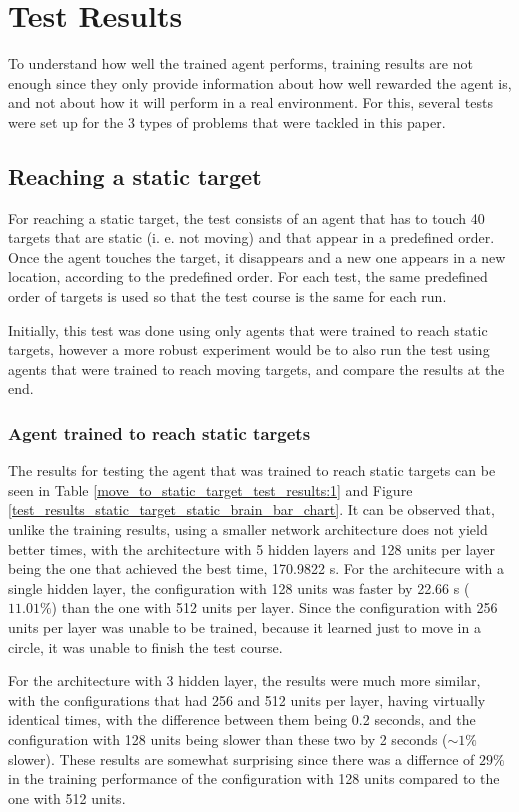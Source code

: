 \chapter{Test Results}

To understand how well the trained agent performs, training results are not enough since they only provide information about how well rewarded the agent is, and not about how it will perform in a real environment. For this, several tests were set up for the 3 types of problems that were tackled in this paper.


\section{Reaching a static target}

For reaching a static target, the test consists of an agent that has to touch 40 targets that are static (i. e. not moving) and that appear in a predefined order. Once the agent touches the target, it disappears and a new one appears in a new location, according to the predefined order. For each test, the same predefined order of targets is used so that the test course is the same for each run. 

Initially, this test was done using only agents that were trained to reach static targets, however a more robust experiment would be to also run the test using agents that were trained to reach moving targets, and compare the results at the end.


\subsection{Agent trained to reach static targets}

The results for testing the agent that was trained to reach static targets can be seen in Table \ref{move_to_static_target_test_results:1} and Figure \ref{test_results_static_target_static_brain_bar_chart}. It can be observed that, unlike the training results, using a smaller network architecture does not yield better times, with the architecture with 5 hidden layers and 128 units per layer being the one that achieved the best time, 170.9822 s. For the architecure with a single hidden layer, the configuration with 128 units was faster by 22.66 s ($11.01\%$) than the one with 512 units per layer. Since the configuration with 256 units per layer was unable to be trained, because it learned just to move in a circle, it was unable to finish the test course.

For the architecture with 3 hidden layer, the results were much more similar, with the configurations that had 256 and 512 units per layer, having virtually identical times, with the difference between them being 0.2 seconds, and the configuration with 128 units being slower than these two by 2 seconds ($\sim1\%$ slower). These results are somewhat surprising since there was a differnce of $29\%$ in the training performance of the configuration with 128 units compared to the one with 512 units.

